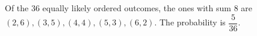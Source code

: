 Of the $36$ equally likely ordered outcomes, the ones with sum $8$ are $(2,6),(3,5),(4,4),(5,3),(6,2)$. The probability is $\boxed{\dfrac{5}{36}}$.

